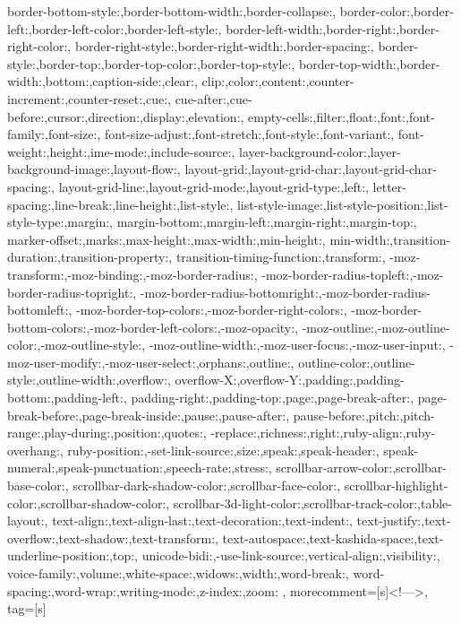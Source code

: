 {{    border-bottom-style:,border-bottom-width:,border-collapse:,
    border-color:,border-left:,border-left-color:,border-left-style:,
    border-left-width:,border-right:,border-right-color:,
    border-right-style:,border-right-width:,border-spacing:,
    border-style:,border-top:,border-top-color:,border-top-style:,
    border-top-width:,border-width:,bottom:,caption-side:,clear:,
    clip:,color:,content:,counter-increment:,counter-reset:,cue:,
    cue-after:,cue-before:,cursor:,direction:,display:,elevation:,
    empty-cells:,filter:,float:,font:,font-family:,font-size:,
    font-size-adjust:,font-stretch:,font-style:,font-variant:,
    font-weight:,height:,ime-mode:,include-source:,
    layer-background-color:,layer-background-image:,layout-flow:,
    layout-grid:,layout-grid-char:,layout-grid-char-spacing:,
    layout-grid-line:,layout-grid-mode:,layout-grid-type:,left:,
    letter-spacing:,line-break:,line-height:,list-style:,
    list-style-image:,list-style-position:,list-style-type:,margin:,
    margin-bottom:,margin-left:,margin-right:,margin-top:,
    marker-offset:,marks:,max-height:,max-width:,min-height:,
    min-width:,transition-duration:,transition-property:,
    transition-timing-function:,transform:,
    -moz-transform:,-moz-binding:,-moz-border-radius:,
    -moz-border-radius-topleft:,-moz-border-radius-topright:,
    -moz-border-radius-bottomright:,-moz-border-radius-bottomleft:,
    -moz-border-top-colors:,-moz-border-right-colors:,
    -moz-border-bottom-colors:,-moz-border-left-colors:,-moz-opacity:,
    -moz-outline:,-moz-outline-color:,-moz-outline-style:,
    -moz-outline-width:,-moz-user-focus:,-moz-user-input:,
    -moz-user-modify:,-moz-user-select:,orphans:,outline:,
    outline-color:,outline-style:,outline-width:,overflow:,
    overflow-X:,overflow-Y:,padding:,padding-bottom:,padding-left:,
    padding-right:,padding-top:,page:,page-break-after:,
    page-break-before:,page-break-inside:,pause:,pause-after:,
    pause-before:,pitch:,pitch-range:,play-during:,position:,quotes:,
    -replace:,richness:,right:,ruby-align:,ruby-overhang:,
    ruby-position:,-set-link-source:,size:,speak:,speak-header:,
    speak-numeral:,speak-punctuation:,speech-rate:,stress:,
    scrollbar-arrow-color:,scrollbar-base-color:,
    scrollbar-dark-shadow-color:,scrollbar-face-color:,
    scrollbar-highlight-color:,scrollbar-shadow-color:,
    scrollbar-3d-light-color:,scrollbar-track-color:,table-layout:,
    text-align:,text-align-last:,text-decoration:,text-indent:,
    text-justify:,text-overflow:,text-shadow:,text-transform:,
    text-autospace:,text-kashida-space:,text-underline-position:,top:,
    unicode-bidi:,-use-link-source:,vertical-align:,visibility:,
    voice-family:,volume:,white-space:,widows:,width:,word-break:,
    word-spacing:,word-wrap:,writing-mode:,z-index:,zoom:
    },  
    morecomment=[s]{<!--}{-->},
    tag=[s]
}
